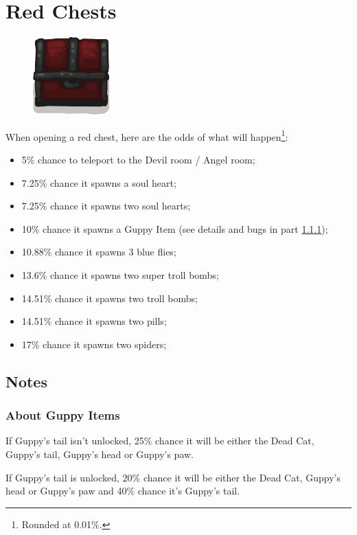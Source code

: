 \section{Red Chests}\label{sec:redchests}

\begin{figure}
   \begin{center}
      \includegraphics{img/RedChest.png}
   \end{center}
\end{figure}
When opening a red chest, here are the odds of what will happen\footnote{Rounded at 0.01\%.}:
\begin{itemize}
\item 5\% chance to teleport to the Devil room / Angel room;
\item 7.25\% chance it spawns a soul heart;
\item 7.25\% chance it spawns two soul hearts;
\item 10\% chance it spawns a Guppy Item (see details and bugs in part \ref{subsec:guppyredchests});
\item 10.88\% chance it spawns 3 blue flies;
\item 13.6\% chance it spawns two super troll bombs;
\item 14.51\% chance it spawns two troll bombs;
\item 14.51\% chance it spawns two pills;
\item 17\% chance it spawns two spiders;
\end{itemize}


\subsection{Notes}
\subsubsection{About Guppy Items}\label{subsec:guppyredchests}
If Guppy's tail isn't unlocked, 25\% chance it will be either the Dead Cat, Guppy's tail, Guppy's head or Guppy's paw.

\noindent If Guppy's tail is unlocked, 20\% chance it will be either the Dead Cat, Guppy's head or Guppy's paw and 40\% chance it's Guppy's tail.\\

